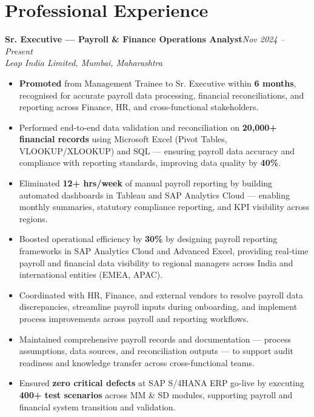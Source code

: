 \documentclass[10pt, letterpaper]{article}
\newcommand{\role}[3]{%
  \vspace{2pt}%
  {\bfseries #1}\hfill{\small\color{muted}\textit{#3}}\\[-2pt]%
  {\small\color{muted}\textit{#2}}%
}
\begin{document}
\section{Professional Experience}

\role{Sr. Executive — Payroll \& Finance Operations Analyst}{Leap India Limited, Mumbai, Maharashtra}{Nov 2024 – Present}

\begin{itemize}
  \item \textbf{Promoted} from Management Trainee to Sr. Executive within \textbf{6 months}, recognised for accurate payroll data processing, financial reconciliations, and reporting across Finance, HR, and cross-functional stakeholders.
  \item Performed end-to-end data validation and reconciliation on \textbf{20,000+ financial records} using Microsoft Excel (Pivot Tables, VLOOKUP/XLOOKUP) and SQL — ensuring payroll data accuracy and compliance with reporting standards, improving data quality by \textbf{40\%}.
  \item Eliminated \textbf{12+ hrs/week} of manual payroll reporting by building automated dashboards in Tableau and SAP Analytics Cloud — enabling monthly summaries, statutory compliance reporting, and KPI visibility across regions.
  \item Boosted operational efficiency by \textbf{30\%} by designing payroll reporting frameworks in SAP Analytics Cloud and Advanced Excel, providing real-time payroll and financial data visibility to regional managers across India and international entities (EMEA, APAC).
  \item Coordinated with HR, Finance, and external vendors to resolve payroll data discrepancies, streamline payroll inputs during onboarding, and implement process improvements across payroll and reporting workflows.
  \item Maintained comprehensive payroll records and documentation — process assumptions, data sources, and reconciliation outputs — to support audit readiness and knowledge transfer across cross-functional teams.
  \item Ensured \textbf{zero critical defects} at SAP S/4HANA ERP go-live by executing \textbf{400+ test scenarios} across MM \& SD modules, supporting payroll and financial system transition and validation.
\end{itemize}

\vspace{1pt}
\end{document}
